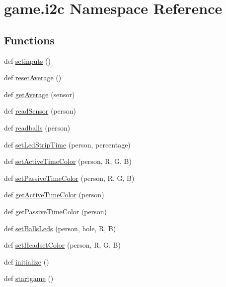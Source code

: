 \hypertarget{namespacegame_1_1i2c}{}\section{game.\+i2c Namespace Reference}
\label{namespacegame_1_1i2c}
\subsection*{Functions}
\begin{DoxyCompactItemize}
\item 
def \hyperlink{namespacegame_1_1i2c_a1d5b4aed68be231c5ca8d1611701a17c}{setinputs} ()
\item 
def \hyperlink{namespacegame_1_1i2c_a7e8169f802337f7cea2d2f1bd574d10b}{reset\+Average} ()
\item 
def \hyperlink{namespacegame_1_1i2c_acd6c2462d1aa66a93f0c6a0082e5e905}{get\+Average} (sensor)
\item 
def \hyperlink{namespacegame_1_1i2c_aa4e92c48e15886b974e184f3f010fc1f}{read\+Sensor} (person)
\item 
def \hyperlink{namespacegame_1_1i2c_ab81bf937d9c153a616b84229be27cfdf}{readballs} (person)
\item 
def \hyperlink{namespacegame_1_1i2c_ae885c09ef1646e179bf8b880fbb284a6}{set\+Led\+Strip\+Time} (person, percentage)
\item 
def \hyperlink{namespacegame_1_1i2c_a6c70916a0df4071830627cc65b734df4}{set\+Active\+Time\+Color} (person, R, G, B)
\item 
def \hyperlink{namespacegame_1_1i2c_a53e720c22085d10f15012190ea3f8ab9}{set\+Passive\+Time\+Color} (person, R, G, B)
\item 
def \hyperlink{namespacegame_1_1i2c_a16a8d8b75765d12d7dfd792a454d7f18}{get\+Active\+Time\+Color} (person)
\item 
def \hyperlink{namespacegame_1_1i2c_aff5b5c1346a69dfa85f464da0d1df030}{get\+Passive\+Time\+Color} (person)
\item 
def \hyperlink{namespacegame_1_1i2c_a6cc044fcf10970e62f6e7d8a8eea7dbd}{set\+Balls\+Leds} (person, hole, R, B)
\item 
def \hyperlink{namespacegame_1_1i2c_a2988a923a2bb6a9d2f4c8e7409e0aded}{set\+Headset\+Color} (person, R, G, B)
\item 
def \hyperlink{namespacegame_1_1i2c_aa72744d8ce34e48fe75bd216ac66d0e4}{initialize} ()
\item 
def \hyperlink{namespacegame_1_1i2c_a3a43a96db3ce557e507f3c08617b19c5}{startgame} ()
\end{DoxyCompactItemize}
